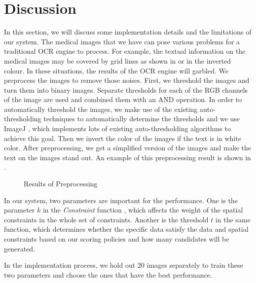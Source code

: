 \section{Discussion}
\label{sec:discuss}
In this section, we will discuss some implementation details
and the limitations of our system. 
The medical images that we have can pose various problems 
for a traditional OCR engine to process. For example, 
the textual information on the medical images may be 
covered by grid lines as shown in  or 
in the inverted colour. In these situations, the results of 
the OCR engine will garbled. We preprocess the 
images to remove those noises. First, we threshold the 
images and turn them into binary images. 
Separate thresholds for each of the RGB channels of the image 
are used and combined them with an AND operation. 
In order to automatically threshold the images, 
we make use of the existing auto-thresholding techniques 
to automatically determine the thresholds and we 
use ImageJ \cite{schneider2012671}, which implements lots 
of existing auto-thresholding algorithms to achieve this goal. 
Then we invert the color of the images if the text 
is in white color. 
After preprocessing, we get a simplified version of the 
images and make the text on the images stand out. 
An example of this preprocessing result is shown in . 

\begin{figure}[ht]
\centering
{}
\hfill
{}
\caption{Results of Preprocessing}
\label{fig:preprocess}
\end{figure}


In our system, two parameters are important for the 
performance. 
One is the parameter $k$ in the {\em Constraint} function 
, 
which affects the weight of 
the spatial constraints in the whole set of constraints. 
Another 
is the threshold $t$ in the same function, which 
determines whether the specific data satisfy the 
data and spatial constraints based on our scoring policies 
and how many candidates will be generated.  

In the implementation process, 
we hold out 20 images separately to train these two parameters 
and choose the ones that have the best performance. 


